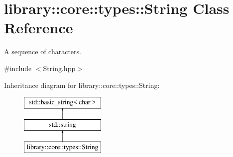 \hypertarget{classlibrary_1_1core_1_1types_1_1_string}{}\section{library\+::core\+::types\+::String Class Reference}
\label{classlibrary_1_1core_1_1types_1_1_string}


A sequence of characters.  




{\ttfamily \#include $<$String.\+hpp$>$}

Inheritance diagram for library\+::core\+::types\+::String\+:\begin{figure}[H]
\begin{center}
\leavevmode
\includegraphics[height=3.000000cm]{classlibrary_1_1core_1_1types_1_1_string}
\end{center}
\end{figure}
